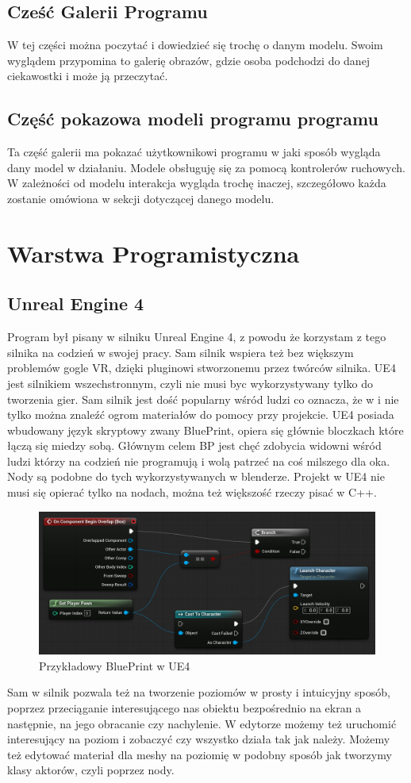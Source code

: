 \documentclass[a4paper,12pt,reqno]{article}
\begin{document}
\subsection{Cześć Galerii Programu}
{\color{blue}
W tej części można poczytać i dowiedzieć się trochę o danym modelu. Swoim wyglądem przypomina to galerię obrazów, gdzie osoba podchodzi do danej ciekawostki i może ją przeczytać.
}
\subsection{Część pokazowa modeli programu programu}
{\color{blue}
Ta część galerii ma pokazać użytkownikowi programu w jaki sposób wygląda dany model w działaniu. Modele obsługuję się za pomocą kontrolerów ruchowych. W zależności od modelu interakcja wygląda trochę inaczej, szczegółowo każda zostanie omówiona w sekcji dotyczącej danego modelu. 
}
\section{Warstwa Programistyczna}

\subsection{Unreal Engine 4}
{\color{red}
Program był pisany w silniku Unreal Engine 4, z powodu że korzystam z tego silnika na codzień w swojej pracy. Sam silnik wspiera też bez większym problemów gogle VR, dzięki pluginowi stworzonemu przez twórców silnika. UE4 jest silnikiem wszechstronnym, czyli nie musi byc wykorzystywany tylko do tworzenia gier. Sam silnik jest dość popularny wśród ludzi co oznacza, że w  i nie tylko można znaleźć ogrom materiałów do pomocy przy projekcie. UE4 posiada wbudowany język skryptowy zwany BluePrint, opiera się głównie bloczkach które łączą się miedzy sobą. Głównym celem BP jest chęć zdobycia widowni wśród ludzi którzy na codzień nie programują i wolą patrzeć na coś milszego dla oka. Nody są podobne do tych wykorzystywanych w blenderze. Projekt w UE4 nie musi się opierać tylko na nodach, można też większość rzeczy pisać w C++.
\begin{figure}[H]%
\centering
\includegraphics[width=0.8\columnwidth]{graphics/BPExample.png}
\caption{Przykładowy BluePrint w UE4
\label{BPExample}}%
%
\qquad
\end{figure}  

 Sam w silnik pozwala też na tworzenie poziomów w prosty i intuicyjny sposób, poprzez przeciąganie interesującego nas obiektu bezpośrednio na ekran a następnie, na jego obracanie czy nachylenie. W edytorze możemy też uruchomić interesujący na poziom i zobaczyć czy wszystko działa tak jak należy. Możemy też edytować materiał dla meshy na poziomię w podobny sposób jak tworzymy klasy aktorów, czyli poprzez nody. 
}
\end{document}
